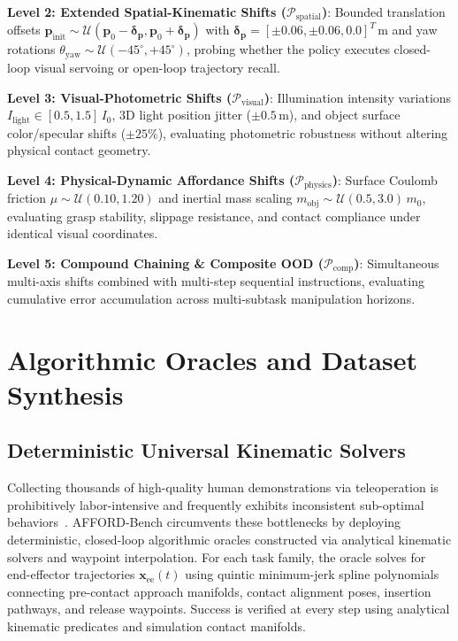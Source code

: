 \documentclass[conference]{IEEEtran}
\begin{document}
\textbf{Level 2: Extended Spatial-Kinematic Shifts ($\mathcal{P}_{\mathrm{spatial}}$)}: Bounded translation offsets $\mathbf{p}_{\text{init}} \sim \mathcal{U}(\mathbf{p}_0 - \boldsymbol{\delta}_{\mathbf{p}}, \mathbf{p}_0 + \boldsymbol{\delta}_{\mathbf{p}})$ with $\boldsymbol{\delta}_{\mathbf{p}} = [\pm 0.06, \pm 0.06, 0.0]^T\,\text{m}$ and yaw rotations $\theta_{\text{yaw}} \sim \mathcal{U}(-45^\circ, +45^\circ)$, probing whether the policy executes closed-loop visual servoing or open-loop trajectory recall.

\textbf{Level 3: Visual-Photometric Shifts ($\mathcal{P}_{\mathrm{visual}}$)}: Illumination intensity variations $I_{\text{light}} \in [0.5, 1.5]\,I_0$, 3D light position jitter ($\pm 0.5\,\text{m}$), and object surface color/specular shifts ($\pm 25\%$), evaluating photometric robustness without altering physical contact geometry.

\textbf{Level 4: Physical-Dynamic Affordance Shifts ($\mathcal{P}_{\mathrm{physics}}$)}: Surface Coulomb friction $\mu \sim \mathcal{U}(0.10, 1.20)$ and inertial mass scaling $m_{\text{obj}} \sim \mathcal{U}(0.5, 3.0)\,m_0$, evaluating grasp stability, slippage resistance, and contact compliance under identical visual coordinates.

\textbf{Level 5: Compound Chaining \& Composite OOD ($\mathcal{P}_{\mathrm{comp}}$)}: Simultaneous multi-axis shifts combined with multi-step sequential instructions, evaluating cumulative error accumulation across multi-subtask manipulation horizons.

\section{Algorithmic Oracles and Dataset Synthesis}
\label{sec:oracles}

\subsection{Deterministic Universal Kinematic Solvers}
Collecting thousands of high-quality human demonstrations via teleoperation is prohibitively labor-intensive and frequently exhibits inconsistent sub-optimal behaviors~\cite{mandlekar2021robomimic}. AFFORD-Bench circumvents these bottlenecks by deploying deterministic, closed-loop algorithmic oracles constructed via analytical kinematic solvers and waypoint interpolation. For each task family, the oracle solves for end-effector trajectories $\mathbf{x}_{\text{ee}}(t)$ using quintic minimum-jerk spline polynomials connecting pre-contact approach manifolds, contact alignment poses, insertion pathways, and release waypoints. Success is verified at every step using analytical kinematic predicates and simulation contact manifolds.
\end{document}

